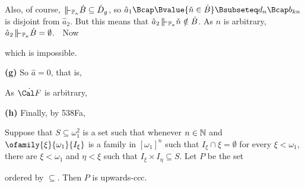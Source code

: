 {\noindent Also, of course, $\VVdPk\dot B\subseteq\dot D_g$, so
$\hat a_1\Bcap\Bvalue{\check n\in\dot B}\Bsubseteq d_n\Bcap b_{kn}$ is
disjoint from $\hat a_2$.   But this means that
$\hat a_2\VVdPk\check n\notin\dot B$.
As $n$ is arbitrary, $\hat a_2\VVdPk\dot B=\emptyset$.\ \QeD\   Now


\noindent which is impossible.\ \Bang

\medskip

{\bf (g)} So $\hat a=0$, that is,


\noindent As $\dot{\Cal F}$ is arbitrary,


\medskip

{\bf (h)} Finally, by 538Fa,

}%

Suppose that $S\subseteq\omega_1^2$ is a set such that
whenever $n\in\Bbb N$ and
$\ofamily{\xi}{\omega_1}{I_{\xi}}$ is a family in $[\omega_1]^n$ such that
$I_{\xi}\cap\xi=\emptyset$ for every $\xi<\omega_1$, there are
$\xi<\omega_1$ and $\eta<\xi$ such that
$I_{\xi}\times I_{\eta}\subseteq S$.   Let $P$ be the set


\noindent ordered by $\subseteq$.   Then $P$ is upwards-ccc.

